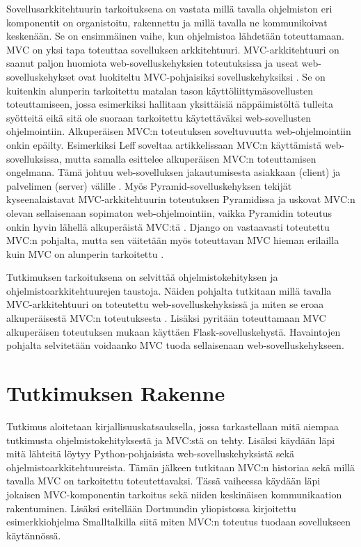 \documentclass[utf8]{gradu3}
\begin{document}
Sovellusarkkitehtuurin tarkoituksena on vastata millä tavalla ohjelmiston eri komponentit on organistoitu, rakennettu ja millä tavalla ne kommunikoivat keskenään. Se on ensimmäinen vaihe, kun ohjelmistoa lähdetään toteuttamaan. MVC on yksi tapa
toteuttaa sovelluksen arkkitehtuuri.    \parencite[s. 148]{Sommerville} MVC-arkkitehtuuri on saanut paljon huomiota web-sovelluskehyksien
toteutuksissa ja useat web-sovelluskehykset ovat luokiteltu
MVC-pohjaisiksi sovelluskehyksiksi \parencite{mvcframeworks}. Se on kuitenkin alunperin
tarkoitettu matalan tason käyttöliittymäsovellusten toteuttamiseen,
jossa esimerkiksi hallitaan yksittäisiä näppäimistöltä tulleita
syötteitä eikä sitä ole suoraan tarkoitettu käytettäväksi
web-sovellusten ohjelmointiin. Alkuperäisen MVC:n toteutuksen
soveltuvuutta web-ohjelmointiin onkin epäilty. Esimerkiksi Leff
soveltaa artikkelissaan MVC:n käyttämistä web-sovelluksissa, mutta
samalla esittelee alkuperäisen MVC:n toteuttamisen ongelmana. Tämä johtuu web-sovelluksen jakautumisesta asiakkaan
(client) ja palvelimen (server) välille \parencite{ibm_watson}. Myös Pyramid-sovelluskehyksen tekijät
kyseenalaistavat MVC-arkkitehtuurin toteutuksen Pyramidissa ja uskovat
MVC:n olevan sellaisenaan sopimaton web-ohjelmointiin, vaikka
Pyramidin toteutus onkin hyvin lähellä alkuperäistä MVC:tä
\parencite{pyramid}. Django on vastaavasti toteutettu MVC:n pohjalta, mutta sen väitetään myös toteuttavan MVC hieman erilailla kuin MVC on alunperin tarkoitettu \parencite{django_mvc}.

Tutkimuksen tarkoituksena on selvittää ohjelmistokehityksen ja ohjelmistoarkkitehtuurejen taustoja. Näiden pohjalta tutkitaan millä tavalla 
MVC-arkkitehtuuri on toteutettu web-sovelluskehyksissä ja miten se
eroaa alkuperäisestä MVC:n toteutuksesta \parencite{krasner}. Lisäksi pyritään toteuttamaan MVC alkuperäisen
toteutuksen mukaan käyttäen Flask-sovelluskehystä. Havaintojen pohjalta
selvitetään voidaanko MVC tuoda sellaisenaan web-sovelluskehykseen.

\chapter{Tutkimuksen Rakenne}
Tutkimus aloitetaan kirjallisuuskatsauksella, jossa tarkastellaan mitä aiempaa 
tutkimusta ohjelmistokehityksestä ja MVC:stä on tehty. Lisäksi käydään
läpi mitä lähteitä löytyy Python-pohjaisista web-sovelluskehyksistä sekä ohjelmistoarkkitehtuureista. Tämän jälkeen 
tutkitaan MVC:n historiaa sekä millä tavalla MVC on tarkoitettu toteutettavaksi.
Tässä vaiheessa käydään läpi jokaisen MVC-komponentin tarkoitus sekä niiden 
keskinäisen kommunikaation rakentuminen. Lisäksi esitellään
Dortmundin yliopistossa kirjoitettu esimerkkiohjelma Smalltalkilla siitä miten MVC:n 
toteutus tuodaan sovellukseen käytännössä.
\end{document}
